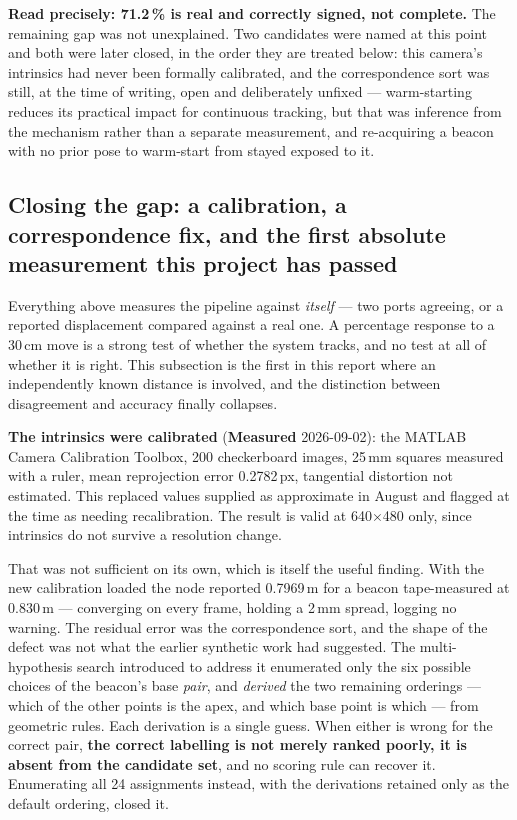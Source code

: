 \documentclass[11pt]{article}
\begin{document}
\textbf{Read precisely: 71.2\,\% is real and correctly signed, not
complete.} The remaining gap was not unexplained. Two candidates were named
at this point and both were later closed, in the order they are treated
below: this camera's intrinsics had never been formally calibrated, and the
correspondence sort was still, at the time of writing, open and deliberately
unfixed --- warm-starting reduces its practical impact for continuous
tracking, but that was inference from the mechanism rather than a separate
measurement, and re-acquiring a beacon with no prior pose to warm-start from
stayed exposed to it.

\subsection{Closing the gap: a calibration, a correspondence fix, and the
first absolute measurement this project has passed}

Everything above measures the pipeline against \emph{itself} --- two ports
agreeing, or a reported displacement compared against a real one. A
percentage response to a 30\,cm move is a strong test of whether the system
tracks, and no test at all of whether it is right. This subsection is the
first in this report where an independently known distance is involved, and
the distinction between disagreement and accuracy finally collapses.

\textbf{The intrinsics were calibrated} (\textbf{Measured} 2026-09-02): the
MATLAB Camera Calibration Toolbox, 200 checkerboard images, 25\,mm squares
measured with a ruler, mean reprojection error 0.2782\,px, tangential
distortion not estimated. This replaced values supplied as approximate in
August and flagged at the time as needing recalibration. The result is valid
at 640$\times$480 only, since intrinsics do not survive a resolution change.

That was not sufficient on its own, which is itself the useful finding. With
the new calibration loaded the node reported 0.7969\,m for a beacon
tape-measured at 0.830\,m --- converging on every frame, holding a 2\,mm
spread, logging no warning. The residual error was the correspondence sort,
and the shape of the defect was not what the earlier synthetic work had
suggested. The multi-hypothesis search introduced to address it enumerated
only the six possible choices of the beacon's base \emph{pair}, and
\emph{derived} the two remaining orderings --- which of the other points is
the apex, and which base point is which --- from geometric rules. Each
derivation is a single guess. When either is wrong for the correct pair,
\textbf{the correct labelling is not merely ranked poorly, it is absent from
the candidate set}, and no scoring rule can recover it. Enumerating all 24
assignments instead, with the derivations retained only as the default
ordering, closed it.
\end{document}
